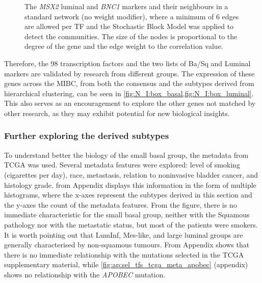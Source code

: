 \begin{figure}[H]
    \caption{The \textit{MSX2} luminal and \textit{BNC1} markers and their neighbours in a standard network (no weight modifier), where a minimum of 6 edges are allowed per TF and the Stochastic Block Model was applied to detect the communities. The size of the nodes is proportional to the degree of the gene and the edge weight to the correlation value.}
    
    \label{fig:N_I:net_neighbours}
\end{figure}


Therefore, the 98 transcription factors and the two lists of Ba/Sq and Luminal markers are validated by research from different groups. The expression of these genes across the MIBC, from both the consensus and the subtypes derived from hierarchical clustering, can be seen in \cref{fig:N_I:box_basal,fig:N_I:box_luminal}. This also serves as an encouragement to explore the other genes not matched by other research, as they may exhibit potential for new biological insights.

\subsubsection*{Further exploring the derived subtypes} \label{s:N_I:sel_tfs_subtypes}

To understand better the biology of the small basal group, the metadata from TCGA \citet{Robertson2017-mg} was used. Several metadata features were explored: level of smoking (cigarettes per day), race, metastasis, relation to noninvasive bladder cancer, and histology grade.  from Appendix displays this information in the form of multiple histograms, where the x-axes represent the subtypes derived in this section and the y-axes the count of the metadata features. From the figure, there is no immediate characteristic for the small basal group, neither with the Squamous pathology nor with the metastatic status, but most of the patients were smokers. It is worth pointing out that LumInf, Mes-like, and large luminal groups are generally characterised by non-squamous tumours. From Appendix  shows that there is no immediate relationship with the mutations selected in the TCGA supplementary material, while \cref{fig:ap:sel_tfs_tcga_meta_apobec} (appendix) shows no relationship with the \textit{APOBEC} mutation.

